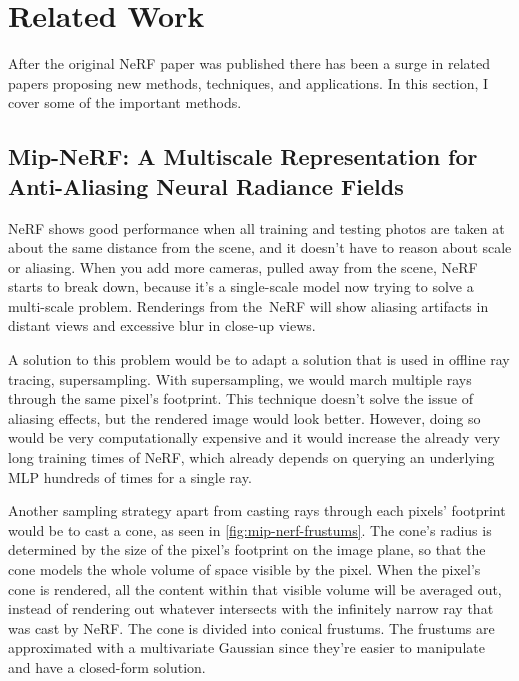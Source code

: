 \section{Related Work}
After the original NeRF paper was published there has been a surge in related papers proposing new methods, techniques, and applications. In this section, I cover some of the important methods.

\subsection{Mip-NeRF: A Multiscale Representation for Anti-Aliasing Neural Radiance Fields} \label{sec:mipnerf}
NeRF shows good performance when all training and testing photos are taken at about the same distance from the scene, and it doesn't have to reason about scale or aliasing. When you add more cameras, pulled away from the scene, NeRF starts to break down, because it's a single-scale model now trying to solve a multi-scale problem. Renderings from the NeRF will show aliasing artifacts in distant views and excessive blur in close-up views.

A solution to this problem would be to adapt a solution that is used in offline ray tracing, supersampling. With supersampling, we would march multiple rays through the same pixel's footprint. This technique doesn't solve the issue of aliasing effects, but the rendered image would look better. However, doing so would be very computationally expensive and it would increase the already very long training times of NeRF, which already depends on querying an underlying MLP hundreds of times for a single ray.

Another sampling strategy apart from casting rays through each pixels' footprint would be to cast a cone, as seen in \autoref{fig:mip-nerf-frustums}. The cone's radius is determined by the size of the pixel's footprint on the image plane, so that the cone models the whole volume of space visible by the pixel. When the pixel's cone is rendered, all the content within that visible volume will be averaged out, instead of rendering out whatever intersects with the infinitely narrow ray that was cast by NeRF. The cone is divided into conical frustums. The frustums are approximated with a multivariate Gaussian since they're easier to manipulate and have a closed-form solution.



